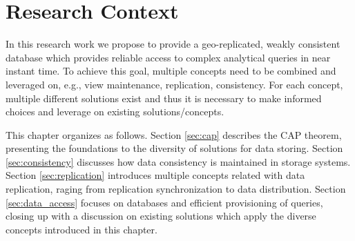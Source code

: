 
%

\chapter{Research Context}
\label{cha:research_context}


In this research work we propose to provide a geo-replicated, weakly consistent database which provides reliable access to complex analytical queries in near instant time.
To achieve this goal, multiple concepts need to be combined and leveraged on, e.g., view maintenance, replication, consistency.
For each concept, multiple different solutions exist and thus it is necessary to make informed choices and leverage on existing solutions/concepts.

This chapter organizes as follows.
Section \ref{sec:cap} describes the CAP theorem, presenting the foundations to the diversity of solutions for data storing.
Section \ref{sec:consistency} discusses how data consistency is maintained in storage systems.
Section \ref{sec:replication} introduces multiple concepts related with data replication, raging from replication synchronization to data distribution. Section
\ref{sec:data_access} focuses on databases and efficient provisioning of queries, closing up with a discussion on existing solutions which apply the diverse concepts introduced in this chapter.





